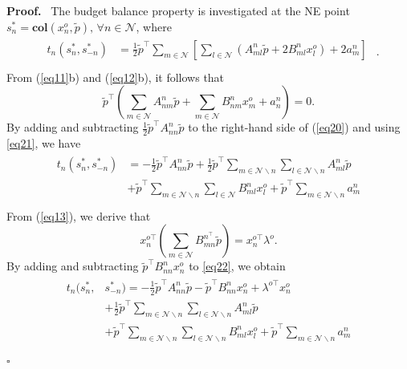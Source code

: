 \documentclass[twocolumn]{autart}
\newenvironment{proof}[1][Proof]{%
  \par\noindent\textbf{#1.}\ }{%
  \hfill$\square$\par
}
\begin{document}
\begin{proof}
	The budget balance property is investigated at the NE point $s_n^*=\textbf{col}(x_n^o, \tilde{p}), \, \forall n\in\mathcal{N}$, where
	\begin{equation}\label{eq20}
	\begin{aligned}
	\begin{split}
	t_n(s_n^*, s_{-n}^*)&=\frac{1}{2}\tilde{p}^{\top}\sum_{m\in\mathcal{N}}{\left[\sum_{l\in\mathcal{N}}{(A_{ml}^n\tilde{p}+2B_{ml}^nx_l^o)}+2a_m^n\right]}\\
	\end{split}
	\end{aligned}.	
	\end{equation}
	From (\ref{eq11}b) and (\ref{eq12}b), it follows that
	\begin{equation}\label{eq21}
		\tilde{p}^\top\left(\sum_{m\in\mathcal{N}}{A_{nm}^{n}\tilde{p}}+\sum_{m\in\mathcal{N}}{B_{nm}^nx_m^o}+a_n^{n}\right)=0.
	\end{equation}
	By adding and subtracting $\frac{1}{2}\tilde{p}^{\top}A_{nn}^n\tilde{p}$ to the right-hand side of (\ref{eq20}) and using \eqref{eq21}, we have
	\begin{equation}\label{eq22}
	\begin{aligned}
	\begin{split}
	t_n(s_n^*, s_{-n}^*)&=-\frac{1}{2}\tilde{p}^{\top}A_{nn}^n\tilde{p}+\frac{1}{2}\tilde{p}^{\top}\sum_{m\in\mathcal{N}\backslash n}{\sum_{l\in\mathcal{N}\backslash n}{A_{ml}^n}}\tilde{p}\\&
	+\tilde{p}^{\top}\sum_{m\in\mathcal{N}\backslash n}{\sum_{l\in\mathcal{N}}{B_{ml}^nx_l^o}}+\tilde{p}^{\top}\sum_{m\in\mathcal{N}\backslash n}{a_m^n}\\
	\end{split}
	\end{aligned}	
	\end{equation}
	From (\ref{eq13}), we derive that \[x_n^{o\top}(\sum_{m\in\mathcal{N}}{B_{mn}^{n^\top}\tilde{p}})= x_n^{o\top}\lambda^o.\] By adding and subtracting $\tilde{p}^{\top}B_{nn}^nx_n^o$ to \eqref{eq22}, we obtain
	\begin{equation}\label{eq23}
	\begin{aligned}
	\begin{split}
	t_n(s_n^*, &s_{-n}^*)=-\frac{1}{2}\tilde{p}^{\top}A_{nn}^n\tilde{p}-\tilde{p}^{\top}B_{nn}^nx_n^o+\lambda^{o\top}x_n^o\\&+\frac{1}{2}\tilde{p}^{\top}\sum_{m\in\mathcal{N}\backslash n}{\sum_{l\in\mathcal{N}\backslash n}{A_{ml}^n}}\tilde{p}\\&+\tilde{p}^{\top}\sum_{m\in\mathcal{N}\backslash n}{\sum_{l\in\mathcal{N}\backslash n}{B_{ml}^nx_l^o}}+\tilde{p}^{\top}\sum_{m\in\mathcal{N}\backslash n}{a_m^n}\\

\end{split}
\end{aligned}
\end{equation}
\end{proof}
\end{document}
